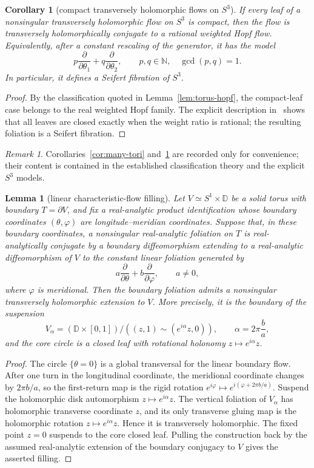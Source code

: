 \documentclass[11pt,reqno]{article}
\newtheorem{lemma}[theorem]{Lemma}
\newtheorem{corollary}{Corollary}
\theoremstyle{remark}
\newtheorem*{remark}{Remark}
\newcommand{\D}{\mathbb D}
\newcommand{\pd}{\partial}
\begin{document}
\begin{corollary}[compact transversely holomorphic flows on $S^3$]\label{cor:compact-th}
If every leaf of a nonsingular transversely holomorphic flow on $S^3$ is compact, then the flow is transversely holomorphically conjugate to a rational weighted Hopf flow. Equivalently, after a constant rescaling of the generator, it has the model
\[
 p\frac{\pd}{\pd\theta_1}+q\frac{\pd}{\pd\theta_2},
 \qquad p,q\in\mathbb N,\quad \gcd(p,q)=1.
\]
In particular, it defines a Seifert fibration of $S^3$.
\end{corollary}

\begin{proof}
By the classification quoted in Lemma~\ref{lem:torus-hopf}, the compact-leaf case belongs to the real weighted Hopf family. The explicit description in~\cite[Propositions~6.1 and~6.2]{GeigesGonzalo2016} shows that all leaves are closed exactly when the weight ratio is rational; the resulting foliation is a Seifert fibration.
\end{proof}

\begin{remark}
Corollaries~\ref{cor:many-tori} and~\ref{cor:compact-th} are recorded only for convenience; their content is contained in the established classification theory and the explicit $S^3$ models.
\end{remark}

\begin{lemma}[linear characteristic-flow filling]\label{lem:linear-filling}
Let $V\simeq S^1\times\D$ be a solid torus with boundary $T=\partial V$, and fix a real-analytic product identification whose boundary coordinates $(\theta,\varphi)$ are longitude--meridian coordinates. Suppose that, in these boundary coordinates, a nonsingular real-analytic foliation on $T$ is real-analytically conjugate by a boundary diffeomorphism extending to a real-analytic diffeomorphism of $V$ to the constant linear foliation generated by
\[
 a\frac{\pd}{\pd\theta}+b\frac{\pd}{\pd\varphi},\qquad a\ne0,
\]
where $\varphi$ is meridional. Then the boundary foliation admits a nonsingular transversely holomorphic extension to $V$. More precisely, it is the boundary of the suspension
\[
 V_\alpha=(\D\times[0,1])/((z,1)\sim(e^{i\alpha}z,0)),
 \qquad \alpha=2\pi\frac ba,
\]
and the core circle is a closed leaf with rotational holonomy $z\mapsto e^{i\alpha}z$.
\end{lemma}

\begin{proof}
The circle $\{\theta=0\}$ is a global transversal for the linear boundary flow. After one turn in the longitudinal coordinate, the meridional coordinate changes by $2\pi b/a$, so the first-return map is the rigid rotation $e^{i\varphi}\mapsto e^{i(\varphi+2\pi b/a)}$. Suspend the holomorphic disk automorphism $z\mapsto e^{i\alpha}z$. The vertical foliation of $V_\alpha$ has holomorphic transverse coordinate $z$, and its only transverse gluing map is the holomorphic rotation $z\mapsto e^{i\alpha}z$. Hence it is transversely holomorphic. The fixed point $z=0$ suspends to the core closed leaf. Pulling the construction back by the assumed real-analytic extension of the boundary conjugacy to $V$ gives the asserted filling.
\end{proof}
\end{document}

